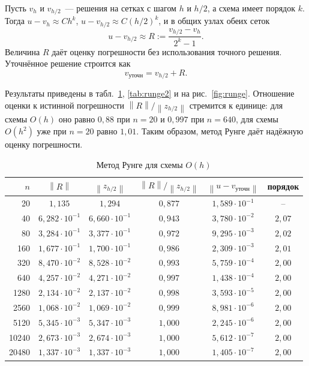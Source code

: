 \documentclass[12pt,a4paper]{article}
\newcommand{\norm}[1]{\left\lVert #1\right\rVert}
\begin{document}
Пусть $v_h$ и $v_{h/2}$~--- решения на сетках с шагом $h$ и $h/2$, а
схема имеет порядок $k$. Тогда
$u - v_h\approx Ch^k$, $u - v_{h/2}\approx C(h/2)^k$, и в общих узлах
обеих сеток
\[
u - v_{h/2}\approx R := \frac{v_{h/2} - v_h}{2^k-1}.
\]
Величина $R$ даёт оценку погрешности без использования точного решения.
Уточнённое решение строится как
\[
v_{\text{уточн}} = v_{h/2} + R .
\]

Результаты приведены в табл.~\ref{tab:runge1}, \ref{tab:runge2} и на
рис.~\ref{fig:runge}. Отношение оценки к истинной погрешности
$\norm{R}/\norm{z_{h/2}}$ стремится к единице: для схемы $O(h)$ оно
равно $0{,}88$ при $n=20$ и $0{,}997$ при $n=640$, для схемы $O(h^2)$
уже при $n=20$ равно $1{,}01$. Таким образом, метод Рунге даёт
надёжную оценку погрешности.

\begin{table}[htbp]
\caption{Метод Рунге для схемы $O(h)$}
\label{tab:runge1}
\centering
\begin{tabular}{rccccc}
\toprule
$n$ & $\norm{R}$ & $\norm{z_{h/2}}$ & $\norm{R}/\norm{z_{h/2}}$ &
$\norm{u - v_{\text{уточн}}}$ & порядок\\
\midrule
20    & $1{,}135$             & $1{,}294$             & $0{,}877$ & $1{,}589\cdot10^{-1}$ & --\\
40    & $6{,}282\cdot10^{-1}$ & $6{,}660\cdot10^{-1}$ & $0{,}943$ & $3{,}780\cdot10^{-2}$ & $2{,}07$\\
80    & $3{,}284\cdot10^{-1}$ & $3{,}377\cdot10^{-1}$ & $0{,}972$ & $9{,}295\cdot10^{-3}$ & $2{,}02$\\
160   & $1{,}677\cdot10^{-1}$ & $1{,}700\cdot10^{-1}$ & $0{,}986$ & $2{,}309\cdot10^{-3}$ & $2{,}01$\\
320   & $8{,}470\cdot10^{-2}$ & $8{,}528\cdot10^{-2}$ & $0{,}993$ & $5{,}759\cdot10^{-4}$ & $2{,}00$\\
640   & $4{,}257\cdot10^{-2}$ & $4{,}271\cdot10^{-2}$ & $0{,}997$ & $1{,}438\cdot10^{-4}$ & $2{,}00$\\
1280  & $2{,}134\cdot10^{-2}$ & $2{,}137\cdot10^{-2}$ & $0{,}998$ & $3{,}593\cdot10^{-5}$ & $2{,}00$\\
2560  & $1{,}068\cdot10^{-2}$ & $1{,}069\cdot10^{-2}$ & $0{,}999$ & $8{,}981\cdot10^{-6}$ & $2{,}00$\\
5120  & $5{,}345\cdot10^{-3}$ & $5{,}347\cdot10^{-3}$ & $1{,}000$ & $2{,}245\cdot10^{-6}$ & $2{,}00$\\
10240 & $2{,}673\cdot10^{-3}$ & $2{,}674\cdot10^{-3}$ & $1{,}000$ & $5{,}612\cdot10^{-7}$ & $2{,}00$\\
20480 & $1{,}337\cdot10^{-3}$ & $1{,}337\cdot10^{-3}$ & $1{,}000$ & $1{,}405\cdot10^{-7}$ & $2{,}00$\\
\bottomrule
\end{tabular}
\end{table}
\end{document}
